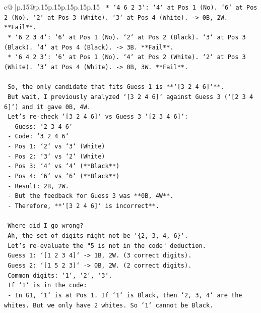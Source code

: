 \documentclass{article}
\begin{document}
{\begin{supertabular}{c@{$\;$}|p{.15\linewidth}@{}p{.15\linewidth}p{.15\linewidth}p{.15\linewidth}p{.15\linewidth}p{.15\linewidth}}
{{{\texttt{    *   `4 6 2 3`: `4` at Pos 1 (No). `6` at Pos 2 (No). `2` at Pos 3 (White). `3` at Pos 4 (White). {-}> 0B, 2W. **Fail**.} \\
\texttt{    *   `6 2 3 4`: `6` at Pos 1 (No). `2` at Pos 2 (Black). `3` at Pos 3 (Black). `4` at Pos 4 (Black). {-}> 3B. **Fail**.} \\
\texttt{    *   `6 4 2 3`: `6` at Pos 1 (No). `4` at Pos 2 (White). `2` at Pos 3 (White). `3` at Pos 4 (White). {-}> 0B, 3W. **Fail**.} \\
\\ 
\texttt{    So, the only candidate that fits Guess 1 is **`{[}3 2 4 6{]}`**.} \\
\texttt{    But wait, I previously analyzed `{[}3 2 4 6{]}` against Guess 3 (`{[}2 3 4 6{]}`) and it gave 0B, 4W.} \\
\texttt{    Let's re{-}check `{[}3 2 4 6{]}` vs Guess 3 `{[}2 3 4 6{]}`:} \\
\texttt{    {-} Guess: `2 3 4 6`} \\
\texttt{    {-} Code: `3 2 4 6`} \\
\texttt{    {-} Pos 1: `2` vs `3` (White)} \\
\texttt{    {-} Pos 2: `3` vs `2` (White)} \\
\texttt{    {-} Pos 3: `4` vs `4` (**Black**)} \\
\texttt{    {-} Pos 4: `6` vs `6` (**Black**)} \\
\texttt{    {-} Result: 2B, 2W.} \\
\texttt{    {-} But the feedback for Guess 3 was **0B, 4W**.} \\
\texttt{    {-} Therefore, **`{[}3 2 4 6{]}` is incorrect**.} \\
\\ 
\texttt{    Where did I go wrong?} \\
\texttt{    Ah, the set of digits might not be `\{2, 3, 4, 6\}`.} \\
\texttt{    Let's re{-}evaluate the "5 is not in the code" deduction.} \\
\texttt{    Guess 1: `{[}1 2 3 4{]}` {-}> 1B, 2W. (3 correct digits).} \\
\texttt{    Guess 2: `{[}1 5 2 3{]}` {-}> 0B, 2W. (2 correct digits).} \\
\texttt{    Common digits: `1`, `2`, `3`.} \\
\texttt{    If `1` is in the code:} \\
\texttt{      {-} In G1, `1` is at Pos 1. If `1` is Black, then `2, 3, 4` are the whites. But we only have 2 whites. So `1` cannot be Black.} \\
}}}
\end{supertabular}}
\end{document}
